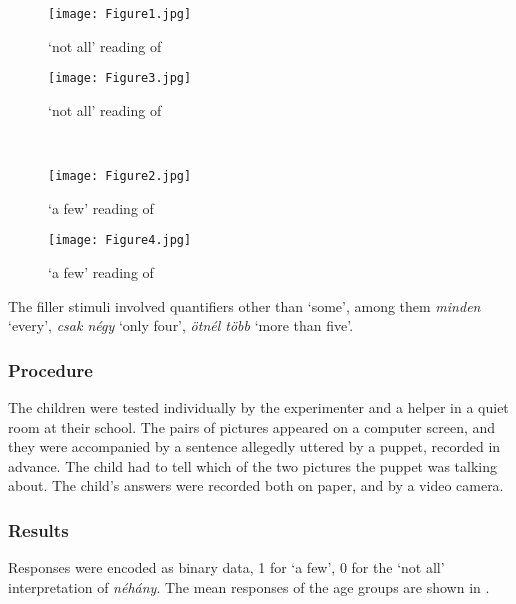 \documentclass[output=paper]{langscibook}
\begin{document}
\begin{figure}[h]
\RawFloats
\centering
\begin{minipage}[b]{0.49\textwidth}
    \centering
    \texttt{[image: Figure1.jpg]}
    \caption{`not all' reading of }
    \label{kis-zet:cow not all}
\end{minipage}
\begin{minipage}[b]{0.49\textwidth}
    \centering
    \texttt{[image: Figure3.jpg]}
    \caption{`not all' reading of }
    \label{kis-zet:bicycle not all}
\end{minipage}
~
\begin{minipage}[b]{0.49\textwidth}
    \centering
    \texttt{[image: Figure2.jpg]}
    \caption{`a few' reading of }
    \label{kis-zet:com few}
\end{minipage}
\begin{minipage}[b]{0.49\textwidth}
    \centering
    \texttt{[image: Figure4.jpg]}
    \caption{`a few' reading of }
    \label{kis-zet:bicycle few}
\end{minipage}
\end{figure}

The filler stimuli involved quantifiers other than `some', among them \textit{minden} `every', \textit{csak négy} `only four', \textit{ötnél több} `more than five'.

\subsubsection{Procedure}

The children were tested individually by the experimenter and a helper in a quiet room at their school. The pairs of pictures appeared on a computer screen, and they were accompanied by a sentence allegedly uttered by a puppet, recorded in advance. The child had to tell which of the two pictures the puppet was talking about. The child’s answers were recorded both on paper, and by a video camera.

\subsubsection{Results} 

Responses were encoded as binary data, 1 for `a few', 0 for the `not all' interpretation of \textit{néhány}. The mean responses of the age groups are shown in . 
\end{document}
